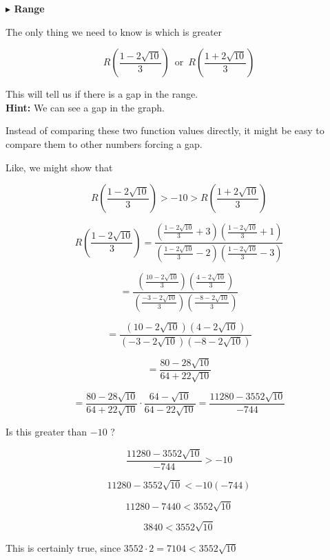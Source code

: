 \documentclass{ximera}
\begin{document}
\textbf{\textcolor{blue!55!black}{$\blacktriangleright$ Range}} 




The only thing we need to know is which is greater 

\[
R \left( \frac{1 - 2 \sqrt{10}}{3} \right) \, \text{ or } \, R \left( \frac{1 + 2 \sqrt{10}}{3} \right)
\]



This will tell us if there is a gap in the range. \\
\textbf{Hint:} We can see a gap in the graph. 

Instead of comparing these two function values directly, it might be easy to compare them to other numbers forcing a gap.


Like, we might show that 


\[
R \left( \frac{1 - 2 \sqrt{10}}{3} \right) > -10 > R \left( \frac{1 + 2 \sqrt{10}}{3} \right)
\]


\[
R\left( \frac{1 - 2 \sqrt{10}}{3}   \right) = \frac{\left( \frac{1 - 2 \sqrt{10}}{3} + 3 \right) \left( \frac{1 - 2 \sqrt{10}}{3} + 1 \right)}{\left( \frac{1 - 2 \sqrt{10}}{3} - 2 \right)  \left( \frac{1 - 2 \sqrt{10}}{3} - 3 \right)}
\]




\[
= \frac{\left( \frac{10 - 2 \sqrt{10}}{3}  \right) \left( \frac{4 - 2 \sqrt{10}}{3} \right)}{\left( \frac{-3 - 2 \sqrt{10}}{3} \right)  \left( \frac{-8 - 2 \sqrt{10}}{3} \right)}
\]




\[
= \frac{ (10 - 2 \sqrt{10}) (4 - 2 \sqrt{10}) }{ (-3 - 2 \sqrt{10}) (-8 - 2 \sqrt{10}) }
\]



\[
= \frac{ 80 - 28 \sqrt{10} }{ 64 + 22\sqrt{10} }
\]




\[
= \frac{ 80 - 28 \sqrt{10} }{ 64 + 22\sqrt{10} } \cdot \frac{ 64 - \sqrt{10} }{ 64 - 22\sqrt{10} } = \frac{11280 - 3552 \sqrt{10}}{-744}
\]



Is this greater than $-10$ ? 


\[
\frac{11280 - 3552 \sqrt{10}}{-744} > -10
\]

\[
11280 - 3552 \sqrt{10} < -10 (-744)
\]


\[
11280 - 7440 < 3552 \sqrt{10}
\]


\[
3840 < 3552 \sqrt{10}
\]

This is certainly true, since  $3552 \cdot 2 = 7104 < 3552 \sqrt{10}$
\end{document}
